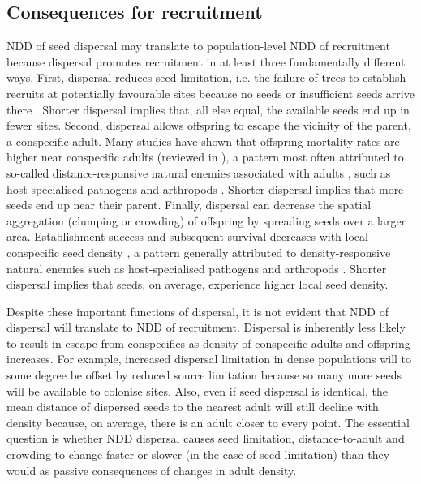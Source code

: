 \documentclass[b5paper,justified]{tufte-book} %
\begin{document}
\begin{fullwidth}
\subsection{Consequences for recruitment}
NDD of seed dispersal may translate to population-level NDD of recruitment because dispersal promotes recruitment
in at least three fundamentally different ways. First, dispersal reduces seed limitation, i.e. the failure of trees to establish recruits at potentially favourable sites because no seeds or insufficient seeds arrive there \citep{Nathan2000, Schupp2002}. Shorter dispersal implies that, all else equal, the available seeds end up in fewer sites. Second, dispersal allows offspring to escape the vicinity of the parent, a conspecific adult. Many studies have shown that offspring mortality rates are higher near conspecific adults (reviewed in \citealt{Hammond1998, Wright2002}), a pattern most often attributed to so-called distance-responsive natural enemies associated with adults \citep{Janzen1970, Connell1971}, such as host-specialised pathogens and arthropods \citep[e.g.][]{Augspurger1984, Alvarez-Loayza2011}. Shorter dispersal implies that more seeds end up near their parent. Finally, dispersal can decrease the spatial aggregation (clumping or crowding) of offspring by spreading seeds over a larger area. Establishment success and subsequent survival decreases with local conspecific seed density \citep[e.g.][]{Harms2000,
Comita2010, Bagchi2014}, a pattern generally attributed to density-responsive natural enemies \citep[\textit{sensu}][]{Janzen1970} such as host-specialised pathogens and arthropods \citep[e.g.][]{Augspurger1984, Bell2006, Bagchi2014}. Shorter dispersal implies that seeds, on average, experience higher local seed density.

Despite these important functions of dispersal, it is not evident that NDD of dispersal will translate to NDD of recruitment. Dispersal is inherently less likely to result in escape from conspecifics as density of conspecific adults and offspring increases. For example, increased dispersal limitation in dense populations will to some degree be offset by reduced source limitation because so many more seeds will be available to colonise sites. Also, even if seed dispersal is identical, the mean distance of dispersed seeds to the nearest adult will still decline with density because, on average, there is an adult closer to every point. The essential question is whether NDD
dispersal causes seed limitation, distance-to-adult and crowding to change faster or slower (in the case of seed limitation) than they would as passive consequences of changes in adult density.


\end{fullwidth}
\end{document}
